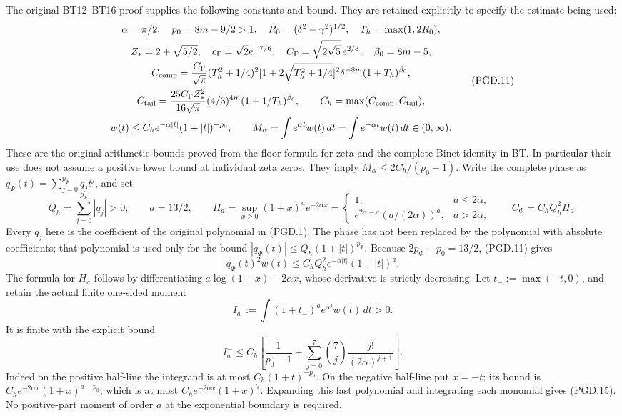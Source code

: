 The original BT12--BT16 proof supplies the following constants and
bound. They are retained explicitly to specify the estimate being used:
\[
 \begin{gathered}
 \alpha=\pi/2,\quad p_0=8m-9/2>1,\quad
 R_0=(\delta^2+\gamma^2)^{1/2},\quad T_h=\max(1,2R_0),\\
 Z_*=2+\sqrt{5/2},\quad
 c_\Gamma=\sqrt2e^{-7/6},\quad
 C_\Gamma=\sqrt{2\sqrt5}\,e^{2/3},\quad \beta_0=8m-5,\\
 C_{\rm comp}=\frac{C_\Gamma}{\sqrt\pi}(T_h^2+1/4)^2
       [1+2\sqrt{T_h^2+1/4}]^2
       \delta^{-8m}(1+T_h)^{\beta_0},\\
 C_{\rm tail}=\frac{25C_\Gamma Z_*^2}{16\sqrt\pi}
       (4/3)^{4m}(1+1/T_h)^{\beta_0},\qquad
 C_h=\max(C_{\rm comp},C_{\rm tail}),\\
 w(t)\leq C_he^{-\alpha|t|}(1+|t|)^{-p_0},\qquad
 M_\alpha=\int e^{\alpha t}w(t)\,dt
         =\int e^{-\alpha t}w(t)\,dt\in(0,\infty).
 \end{gathered}
 \tag{PGD.11}\label{eq:pgd-original-tail}
\]
These are the original arithmetic bounds proved from the floor formula
for zeta and the complete Binet identity in BT. In particular their
use does not assume a positive lower bound at individual zeta zeros.
They imply \(M_\alpha\leq2C_h/(p_0-1)\).
Write the complete phase as
\(q_\Phi(t)=\sum_{j=0}^{p_\Phi}q_jt^j\), and set
\[
 Q_h=\sum_{j=0}^{p_\Phi}|q_j|>0,\qquad
 a=13/2,\qquad
 H_a=\sup_{x\geq0}(1+x)^ae^{-2\alpha x}
  =\begin{cases}
      1,&a\leq2\alpha,\\
      e^{2\alpha-a}(a/(2\alpha))^a,&a>2\alpha,
    \end{cases}
 \qquad C_\Phi=C_hQ_h^2H_a.
 \tag{PGD.12}\label{eq:pgd-phase-constants}
\]
Every \(q_j\) here is the coefficient of the original polynomial in
(PGD.1). The phase has not been replaced by the polynomial with
absolute coefficients; that polynomial is used only for the bound
\(|q_\Phi(t)|\leq Q_h(1+|t|)^{p_\Phi}\).
Because \(2p_\Phi-p_0=13/2\), (PGD.11) gives
\[
 q_\Phi(t)^2w(t)
       \leq C_hQ_h^2e^{-\alpha|t|}(1+|t|)^a.
 \tag{PGD.13}\label{eq:pgd-inserted-tail}
\]
The formula for \(H_a\) follows by differentiating
\(a\log(1+x)-2\alpha x\), whose derivative is strictly decreasing.
Let \(t_-:=\max(-t,0)\), and retain the actual finite one-sided moment
\[
 I_a^-:=\int (1+t_-)^ae^{\alpha t}w(t)\,dt>0.
 \tag{PGD.14}\label{eq:pgd-negative-moment}
\]
It is finite with the explicit bound
\[
 I_a^-\leq C_h\left[
       \frac1{p_0-1}
       +\sum_{j=0}^{7}\binom7j\frac{j!}{(2\alpha)^{j+1}}
                           \right].
 \tag{PGD.15}\label{eq:pgd-negative-moment-bound}
\]
Indeed on the positive half-line the integrand is at most
\(C_h(1+t)^{-p_0}\). On the negative half-line put \(x=-t\);
its bound is \(C_he^{-2\alpha x}(1+x)^{a-p_0}\), which is at
most \(C_he^{-2\alpha x}(1+x)^7\). Expanding this last polynomial
and integrating each monomial gives (PGD.15). No positive-part
moment of order \(a\) at the exponential boundary is required.

